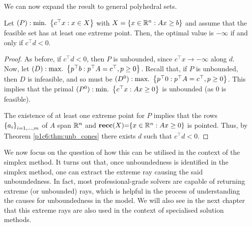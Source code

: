 We can now expand the result to general polyhedral sets.

\begin{theorem}\label{p1c6:thm:unb_polyhedra} 
	Let $(P) : \mathop{\text{min.~}}\left\{ c^\top x : x \in X \right \}$ with $X = \left\{ x \in \mathbb{R}^n : Ax \geq b \right \}$ and assume that the feasible set has at least one extreme point. Then, the optimal value is $-\infty$ if and only if $c^\top d < 0$.  	
\end{theorem}

\begin{proof}
	As before, if $c^\top d < 0$, then $P$ is unbounded, since $c^\top x \rightarrow -\infty$ along $d$. Now, let 
	$(D) : \mathop{\text{max.~}} \left\{ p^\top b : p^\top A = c^\top, p \ge 0 \right \}$. Recall that, if $P$ is unbounded, then $D$ is infeasible, and so must be $(D^0) : \mathop{\text{max.~}} \left\{ p^\top 0 : p^\top A = c^\top, p \ge 0 \right \}$. This implies that the primal $(P^0) : \mathop{\text{min.~}} \left\{ c^\top x : Ax \geq 0 \right \}$ is unbounded (as 0 is feasible).
			
	The existence of at least one extreme point for $P$ implies that the rows $\left\{ a_i \right \}_{i=1,\dots,m}$ of $A$ span $\mathbb{R}^n$ and  ${\bf recc}(X) \hspace{-3pt} =  \hspace{-3pt}\left\{ x \in \mathbb{R}^n : Ax \geq 0 \right \}$ is pointed. Thus, by Theorem \ref{p1c6:thm:unb_cones} there exists $d$ such that $c^\top d < 0$. \qedhere
\end{proof}

We now focus on the question of how this can be utilised in the context of the simplex method. It turns out that, once unboundedness is identified in the simplex method, one can extract the extreme ray causing the said unboundedness. In fact, most professional-grade solvers are capable of returning extreme (or unbounded) rays, which is helpful in the process of understanding  the causes for unboundedness in the model. We will also see in the next chapter that this extreme rays are also used in the context of specialised solution methods.

